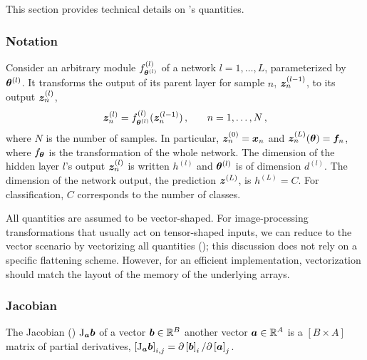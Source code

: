 This section provides technical details on \backpack's quantities.

\subsubsection{Notation}

Consider an arbitrary module $f^{(l)}_{{\bm{\theta}}^{(l)}}$ of a network $l=1,\dots,
L$, parameterized by ${\bm{\theta}}^{(l)}$. It transforms the output of its parent
layer for sample $n$, ${\bm{z}}^{(l-1)}_n$, to its output ${\bm{z}}^{(l)}_n$, \ie
\begin{equation}
  {\bm{z}}^{(l)}_n = f^{(l)}_{{\bm{\theta}}^{(l)}}({\bm{z}}^{(l-1)}_n)\,{,}\qquad n=1,\dots, N\,{,}
\end{equation}
where $N$ is the number of samples. In particular, ${\bm{z}}^{(0)}_n = {\bm{x}}_n$ and
${\bm{z}}^{(L)}_n({\bm{\theta}}) = {\bm{f}}_n$, where $f_{{\bm{\theta}}}$ is the
transformation of the whole network. The dimension of the hidden layer $l$'s
output ${\bm{z}}^{(l)}_n$ is written $h^{(l)}$ and ${\bm{\theta}}^{(l)}$ is of dimension
$d^{(l)}$. The dimension of the network output, the prediction ${\bm{z}}^{(L)}$, is
$h^{(L)} = C$. For classification, $C$ corresponds to the number of classes.

All quantities are assumed to be vector-shaped. For image-processing
transformations that usually act on tensor-shaped inputs, we can reduce to the
vector scenario by vectorizing all quantities
(); this discussion does not rely on a specific
flattening scheme. However, for an efficient implementation, vectorization
should match the layout of the memory of the underlying arrays.

\subsubsection{Jacobian}

The Jacobian ()
$\mathrm{J}_{{\bm{a}}}{\bm{b}}$ of a vector ${\bm{b}} \in \mathbb{R}^B$ \wrt another vector ${\bm{a}}
\in \mathbb{R}^A$ is a $[B \times A]$ matrix of partial derivatives, $\left[\mathrm{J}_{\bm{a}}
  {\bm{b}}\right]_{i,j} = \partial \left[{\bm{b}}\right]_i / \partial \left[{\bm{a}}\right]_j$.

